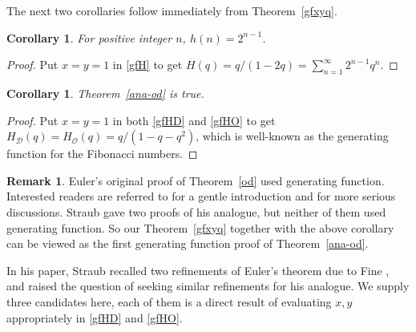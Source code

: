 \documentclass[12pt]{amsart}
\numberwithin{equation}{section}
\theoremstyle{plain}
\newtheorem{corollary}[theorem]{Corollary}
\theoremstyle{definition}
\newtheorem{remark}[theorem]{Remark}
\def\D{\mathcal{D}}
\def\O{\mathcal{O}}
\begin{document}
The next two corollaries follow immediately from Theorem~\ref{gfxyq}.
\begin{corollary}\label{h(n)}
For positive integer $n$, $h(n)=2^{n-1}$.
\end{corollary}
\begin{proof}
Put $x=y=1$ in \eqref{gfH} to get $H(q)=q/(1-2q)=\sum_{n=1}^{\infty}2^{n-1}q^n$.
\end{proof}
\begin{corollary}
Theorem~\ref{ana-od} is true.
\end{corollary}
\begin{proof}
Put $x=y=1$ in both \eqref{gfHD} and \eqref{gfHO} to get $H_{\D}(q)=H_{\O}(q)=q/(1-q-q^2)$, which is well-known as the generating function for the Fibonacci numbers.
\end{proof}
\begin{remark}
Euler's original proof of Theorem~\ref{od} used generating function. Interested readers are referred to \cite[Chapter~2,5]{AE} for a gentle introduction and \cite{Andr} for more serious discussions. Straub \cite{Str} gave two proofs of his analogue, but neither of them used generating function. So our Theorem~\ref{gfxyq} together with the above corollary can be viewed as the first generating function proof of Theorem~\ref{ana-od}.
\end{remark}

In his paper, Straub recalled two refinements \cite[Example 1.7, 1.8]{Str} of Euler's theorem due to Fine \cite{Fine}, and raised the question of seeking similar refinements for his analogue. We supply three candidates here, each of them is a direct result of evaluating $x,y$ appropriately in \eqref{gfHD} and \eqref{gfHO}.
\end{document}
